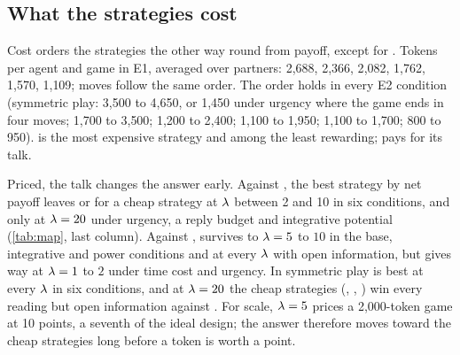 \subsection{What the strategies cost}
\label{sec:cost}
Cost orders the strategies the other way round from payoff, except for \collaborating. Tokens per agent and game in E1, averaged over partners: \competing{} 2{,}688, \collaborating{} 2{,}366, \neutral{} 2{,}082, \compromising{} 1{,}762, \accommodating{} 1{,}570, \avoiding{} 1{,}109; moves follow the same order. The order holds in every E2 condition (symmetric play: \competing{} 3{,}500 to 4{,}650, or 1{,}450 under urgency where the game ends in four moves; \collaborating{} 1{,}700 to 3{,}500; \neutral{} 1{,}200 to 2{,}400; \compromising{} 1{,}100 to 1{,}950; \accommodating{} 1{,}100 to 1{,}700; \avoiding{} 800 to 950). \competing{} is the most expensive strategy and among the least rewarding; \collaborating{} pays for its talk.

Priced, the talk changes the answer early. Against \neutral, the best strategy by net payoff leaves \collaborating{} or \competing{} for a cheap strategy at $\lambda$ between 2 and 10 in six conditions, and only at $\lambda = 20$ under urgency, a reply budget and integrative potential (\cref{tab:map}, last column). Against \competing, \collaborating{} survives to $\lambda = 5$ to $10$ in the base, integrative and power conditions and at every $\lambda$ with open information, but gives way at $\lambda = 1$ to $2$ under time cost and urgency. In symmetric play \accommodating{} is best at every $\lambda$ in six conditions, and at $\lambda = 20$ the cheap strategies (\accommodating, \neutral, \avoiding) win every reading but open information against \competing. For scale, $\lambda = 5$ prices a 2{,}000-token game at 10 points, a seventh of the ideal design; the answer therefore moves toward the cheap strategies long before a token is worth a point.

